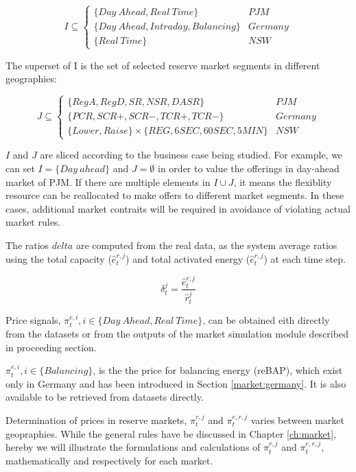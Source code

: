 \begin{equation*}
I \subseteq  \begin{cases}
\{Day~Ahead, Real~Time\} & PJM \\
\{Day~Ahead, Intraday, Balancing\} & Germany \\
\{Real~Time\} & NSW
\end{cases}
\end{equation*}

The superset of I is the set of selected reserve market segments in different geographies:

\begin{equation*}
J \subseteq  \begin{cases}
\{RegA, RegD, SR, NSR, DASR\} & PJM \\
\{PCR, SCR+, SCR-, TCR+, TCR-\} & Germany \\
\{Lower, Raise\} \times \{REG, 6SEC, 60SEC, 5MIN\} & NSW
\end{cases}
\end{equation*}

$I$ and $J$ are sliced according to the business case being studied. For example, we can set $I = \{Day~ahead\}$ and $J=\emptyset$ in order to value the offerings in day-ahead market of PJM. If there are multiple elements in $I \cup J$, it means the flexiblity resource can be reallocated to make offers to different market segments. In these cases, additional market contraits will be required in avoidance of violating actual market rules.

The ratios $delta$ are computed from the real data, as the system average ratios using the total capacity ($\hat{e}_t^{r,j}$) and total activated energy ($\hat{e}_t^{r,j}$) at each time step.

\begin{equation*}
\delta_t^j = \frac{\hat{e}_t^{r,j}}{\hat{r}_t^j}
\end{equation*}

Price signals, $\pi_t^{e,i}, i \in \{Day~Ahead, Real~Time\}$, can be obtained eith directly from the datasets or from the outputs of the market simulation module described in proceeding section.

$\pi_t^{e,i}, i \in \{Balancing\}$, is the the price for balancing energy (reBAP), which exist only in Germany and has been introduced in Section \ref{market:germany}. It is also available to be retrieved from datasets directly.

Determination of prices in reserve markets, $\pi_t^{r,j}$ and $\pi_t^{e,r,j}$ varies between market geopraphies. While the general rules have be discussed in Chapter \ref{ch:market}, hereby we will illustrate the formulations and calculations of $\pi_t^{r,j}$ and $\pi_t^{e,r,j}$, mathematically and respectively for each market.

